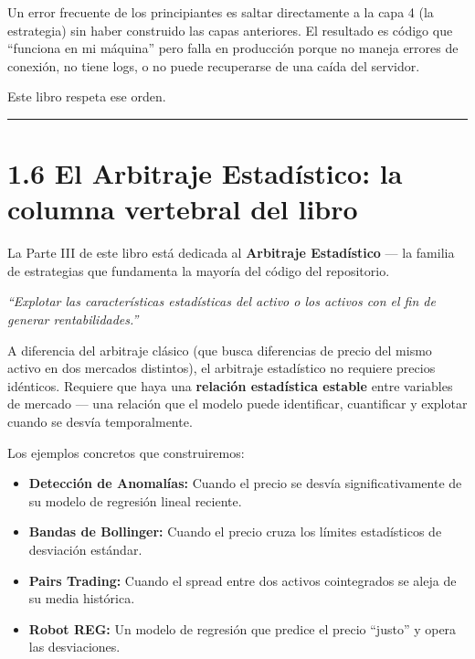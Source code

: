 \documentclass[12pt, a4paper, twoside, openright]{book}
\providecommand{\tightlist}{%
  \setlength{\itemsep}{2pt}\setlength{\parskip}{0pt}}
\renewenvironment{quote}{%
  \begin{mdframed}[style=quotestyle]%
  \itshape\color{bkblue}%
}{%
  \end{mdframed}%
}
\numberwithin{figure}{chapter}
\numberwithin{table}{chapter}
\begin{document}
Un error frecuente de los principiantes es saltar directamente a la capa
4 (la estrategia) sin haber construido las capas anteriores. El
resultado es código que ``funciona en mi máquina'' pero falla en
producción porque no maneja errores de conexión, no tiene logs, o no
puede recuperarse de una caída del servidor.

Este libro respeta ese orden.

\begin{center}\rule{0.5\linewidth}{0.5pt}\end{center}

\section{1.6 El Arbitraje Estadístico: la columna vertebral del
libro}\label{el-arbitraje-estaduxedstico-la-columna-vertebral-del-libro}

La Parte III de este libro está dedicada al \textbf{Arbitraje
Estadístico} --- la familia de estrategias que fundamenta la mayoría del
código del repositorio.

\begin{quote}
\emph{``Explotar las características estadísticas del activo o los
activos con el fin de generar rentabilidades.''}
\end{quote}

A diferencia del arbitraje clásico (que busca diferencias de precio del
mismo activo en dos mercados distintos), el arbitraje estadístico no
requiere precios idénticos. Requiere que haya una \textbf{relación
estadística estable} entre variables de mercado --- una relación que el
modelo puede identificar, cuantificar y explotar cuando se desvía
temporalmente.

Los ejemplos concretos que construiremos:

\begin{itemize}
\tightlist
\item
  \textbf{Detección de Anomalías:} Cuando el precio se desvía
  significativamente de su modelo de regresión lineal reciente.
\item
  \textbf{Bandas de Bollinger:} Cuando el precio cruza los límites
  estadísticos de desviación estándar.
\item
  \textbf{Pairs Trading:} Cuando el spread entre dos activos
  cointegrados se aleja de su media histórica.
\item
  \textbf{Robot REG:} Un modelo de regresión que predice el precio
  ``justo'' y opera las desviaciones.
\end{itemize}
\end{document}
